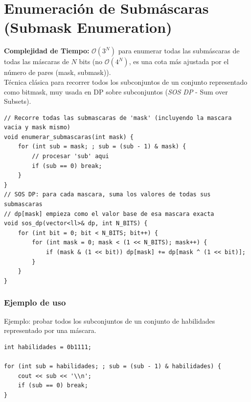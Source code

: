 \documentclass[10pt,twocolumn,letterpaper]{report}
\begin{document}
\section{Enumeración de Submáscaras (Submask Enumeration)}
\textbf{Complejidad de Tiempo:} $\mathcal{O}(3^N)$ para enumerar todas las submáscaras de todas las máscaras de $N$ bits (no $\mathcal{O}(4^N)$, es una cota más ajustada por el número de pares (mask, submask)). \\
Técnica clásica para recorrer todos los subconjuntos de un conjunto representado como bitmask, muy usada en DP sobre subconjuntos (\textit{SOS DP} - Sum over Subsets).
\begin{lstlisting}
// Recorre todas las submascaras de 'mask' (incluyendo la mascara vacia y mask mismo)
void enumerar_submascaras(int mask) {
    for (int sub = mask; ; sub = (sub - 1) & mask) {
        // procesar 'sub' aqui
        if (sub == 0) break;
    }
}
// SOS DP: para cada mascara, suma los valores de todas sus submascaras
// dp[mask] empieza como el valor base de esa mascara exacta
void sos_dp(vector<ll>& dp, int N_BITS) {
    for (int bit = 0; bit < N_BITS; bit++) {
        for (int mask = 0; mask < (1 << N_BITS); mask++) {
            if (mask & (1 << bit)) dp[mask] += dp[mask ^ (1 << bit)];
        }
    }
}
\end{lstlisting}
\subsubsection*{Ejemplo de uso}
Ejemplo: probar todos los subconjuntos de un conjunto de habilidades representado por una máscara.
\begin{lstlisting}
int habilidades = 0b1111;

for (int sub = habilidades; ; sub = (sub - 1) & habilidades) {
    cout << sub << '\\n';
    if (sub == 0) break;
}
\end{lstlisting}
\end{document}
